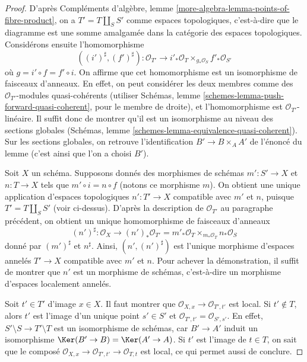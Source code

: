 \begin{proof}
D'après Compléments d'algèbre, lemme \ref{more-algebra-lemma-points-of-fibre-product},
on a $T' = T \amalg_S S'$ comme espaces topologiques, c'est-à-dire que le diagramme
est une somme amalgamée dans la catégorie des espaces topologiques. Considérons ensuite
l'homomorphisme
$$
((i')^\sharp, (f')^\sharp) :
\mathcal{O}_{T'}
\longrightarrow
i'_*\mathcal{O}_T \times_{g_*\mathcal{O}_S} f'_*\mathcal{O}_{S'}
$$
où $g = i' \circ f = f' \circ i$. On affirme que cet homomorphisme est un isomorphisme de
faisceaux d'anneaux. En effet, on peut considérer les deux membres comme des
$\mathcal{O}_{T'}$-modules quasi-cohérents (utiliser
Schémas, lemme \ref{schemes-lemma-push-forward-quasi-coherent},
pour le membre de droite), et l'homomorphisme est $\mathcal{O}_{T'}$-linéaire.
Il suffit donc de montrer qu'il est un isomorphisme au niveau
des sections globales
(Schémas, lemme \ref{schemes-lemma-equivalence-quasi-coherent}).
Sur les sections globales, on retrouve l'identification
$B' \to B \times_A A'$ de l'énoncé du lemme (c'est ainsi
que l'on a choisi $B'$).

\medskip\noindent
Soit $X$ un schéma. Supposons donnés des morphismes de schémas
$m' : S' \to X$ et $n : T \to X$ tels que $m' \circ i = n \circ f$
(notons ce morphisme $m$). On obtient une unique application d'espaces topologiques
$n' : T' \to X$ compatible avec $m'$ et $n$, puisque
$T' = T \amalg_S S'$ (voir ci-dessus).
D'après la description de $\mathcal{O}_{T'}$ au paragraphe
précédent, on obtient un unique homomorphisme de faisceaux d'anneaux
$$
(n')^\sharp :
\mathcal{O}_X
\longrightarrow
(n')_*\mathcal{O}_{T'} =
m'_*\mathcal{O}_T \times_{m_*\mathcal{O}_T} n_*\mathcal{O}_S
$$
donné par $(m')^\sharp$ et $n^\sharp$.
Ainsi, $(n', (n')^\sharp)$ est l'unique morphisme
d'espaces annelés $T' \to X$ compatible avec $m'$ et $n$.
Pour achever la démonstration, il suffit de montrer que $n'$
est un morphisme de schémas, c'est-à-dire un morphisme d'espaces localement annelés.

\medskip\noindent
Soit $t' \in T'$ d'image $x \in X$.
Il faut montrer que $\mathcal{O}_{X, x} \to \mathcal{O}_{T', t'}$
est local. Si $t' \not \in T$, alors $t'$ est l'image d'un unique
point $s' \in S'$ et $\mathcal{O}_{T', t'} = \mathcal{O}_{S', s'}$.
En effet, $S' \setminus S \to T' \setminus T$ est un isomorphisme de
schémas, car $B' \to A'$ induit un isomorphisme
$\Ker(B' \to B) = \Ker(A' \to A)$.
Si $t'$ est l'image de $t \in T$,
on sait que le composé
$\mathcal{O}_{X, x} \to \mathcal{O}_{T', t'} \to \mathcal{O}_{T, t}$
est local, ce qui permet aussi de conclure.
\end{proof}

